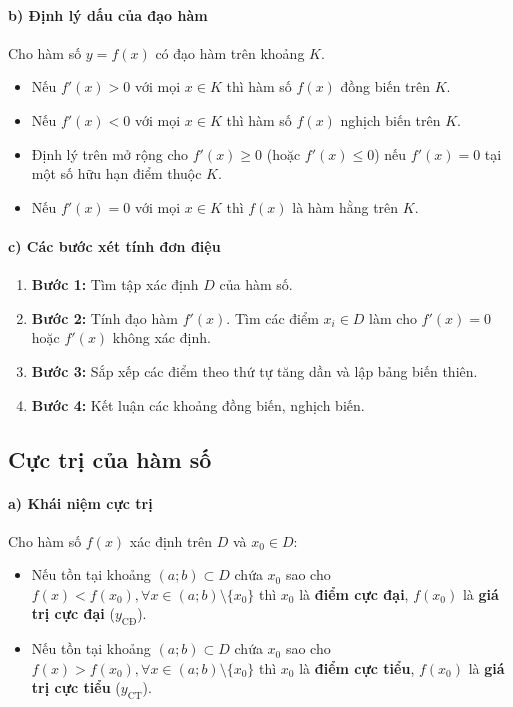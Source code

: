 \documentclass[12pt,a4paper]{article}
\begin{document}
\paragraph{b) Định lý dấu của đạo hàm}
Cho hàm số $y=f(x)$ có đạo hàm trên khoảng $K$.
\begin{itemize}
    \item Nếu $f'(x) > 0$ với mọi $x \in K$ thì hàm số $f(x)$ đồng biến trên $K$.
    \item Nếu $f'(x) < 0$ với mọi $x \in K$ thì hàm số $f(x)$ nghịch biến trên $K$.
\end{itemize}

\begin{notebox}
\begin{itemize}
    \item Định lý trên mở rộng cho $f'(x) \ge 0$ (hoặc $f'(x) \le 0$) nếu $f'(x) = 0$ tại một số hữu hạn điểm thuộc $K$.
    \item Nếu $f'(x) = 0$ với mọi $x \in K$ thì $f(x)$ là hàm hằng trên $K$.
\end{itemize}
\end{notebox}

\paragraph{c) Các bước xét tính đơn điệu}
\begin{enumerate}
    \item \textbf{Bước 1:} Tìm tập xác định $D$ của hàm số.
    \item \textbf{Bước 2:} Tính đạo hàm $f'(x)$. Tìm các điểm $x_i \in D$ làm cho $f'(x) = 0$ hoặc $f'(x)$ không xác định.
    \item \textbf{Bước 3:} Sắp xếp các điểm theo thứ tự tăng dần và lập bảng biến thiên.
    \item \textbf{Bước 4:} Kết luận các khoảng đồng biến, nghịch biến.
\end{enumerate}

\subsection{Cực trị của hàm số}

\paragraph{a) Khái niệm cực trị}
Cho hàm số $f(x)$ xác định trên $D$ và $x_0 \in D$:
\begin{itemize}
    \item Nếu tồn tại khoảng $(a;b) \subset D$ chứa $x_0$ sao cho $f(x) < f(x_0), \forall x \in (a;b) \setminus \{x_0\}$ thì $x_0$ là \textbf{điểm cực đại}, $f(x_0)$ là \textbf{giá trị cực đại} ($y_{\text{CĐ}}$).
    \item Nếu tồn tại khoảng $(a;b) \subset D$ chứa $x_0$ sao cho $f(x) > f(x_0), \forall x \in (a;b) \setminus \{x_0\}$ thì $x_0$ là \textbf{điểm cực tiểu}, $f(x_0)$ là \textbf{giá trị cực tiểu} ($y_{\text{CT}}$).
\end{itemize}
\end{document}
